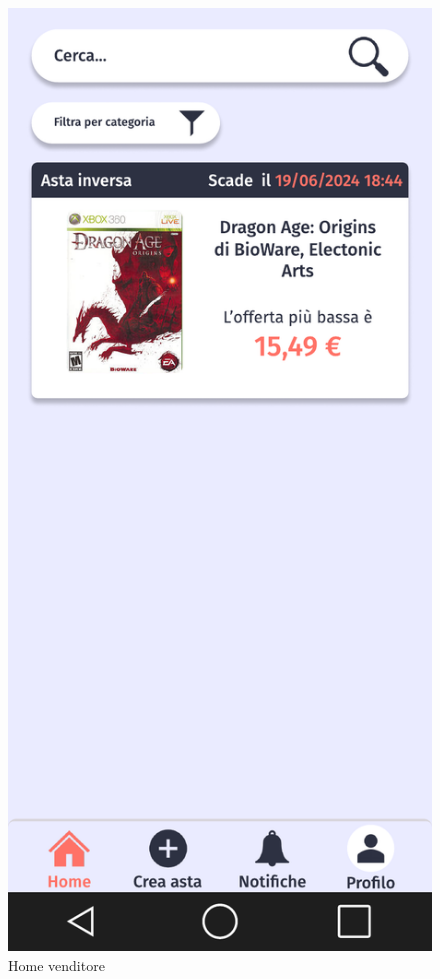         \begin{figure}[!htb]
            \begin{minipage}{0.32\textwidth}
                    \centering
                    \includegraphics[width=.7\linewidth]{Immagini/Frames/Venditore/V1.pdf}
                    \caption{Home venditore}
            \end{minipage}\hfill
            \begin{minipage}{0.32\textwidth}
                \centering

\end{minipage}
\end{figure}
